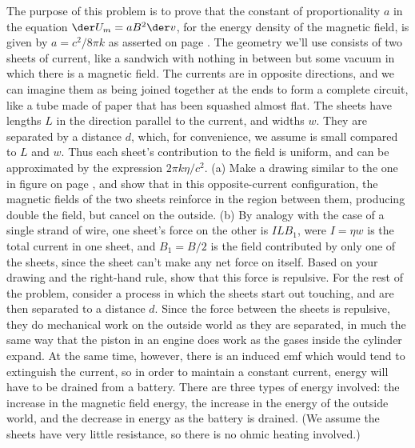 The purpose of this problem is to prove that the constant of proportionality $a$
        in the equation $\der U_m=aB^2 \der v$, for the energy density of the magnetic field,
        is given by $a=c^2/8\pi k$  as asserted
        on page \pageref{benergy}.
        The geometry we'll use consists of two sheets of current, like a sandwich with
        nothing in between but some vacuum in which there is a magnetic field.
        The currents are in opposite directions, and we can imagine them as being
        joined together at the ends to form a complete circuit, like a tube made of
        paper that has been squashed almost flat. The sheets have lengths $L$ in the
        direction parallel to the current, and widths $w$. They are separated by
        a distance $d$, which, for convenience, we assume is small compared to $L$
        and $w$. Thus each sheet's contribution to the
        field is uniform, and can be approximated by the expression $2\pi k\eta/c^2$.\hwendpart
        (a) Make a drawing similar to the one in figure  on page
        \pageref{fig:ebsheet}, and show that in this opposite-current configuration,
        the magnetic fields of the two sheets reinforce in the region between them, 
        producing double the field, but cancel on the outside.\hwendpart
        (b) By analogy with the case of a single strand of wire,
        one sheet's force on the other is $ILB_1$, were $I=\eta w$ is the
        total current in one sheet, and $B_1=B/2$ is the field contributed by only one of the
        sheets, since the sheet can't make any net force on itself.
        Based on your drawing and the right-hand rule, show that this force is repulsive.\hwendpart
        For the rest of the problem, consider a process in which
        the sheets start out touching, and are then separated to a distance $d$. Since
        the force between the sheets is repulsive, they do mechanical work on the
        outside world as they are separated, in much the same way that the piston in an
        engine does work as the gases inside the cylinder expand. At the same time,
        however, there is an induced emf which would tend to extinguish the current,
        so in order to maintain a constant current, energy will have to be drained from
        a battery. There are three
        types of energy involved: the increase in the magnetic field energy, the increase
        in the energy of the outside world, and the decrease in energy as the battery is
        drained. (We assume the sheets have very little resistance, so there is no ohmic
        heating involved.)\answercheck\hwendpart
